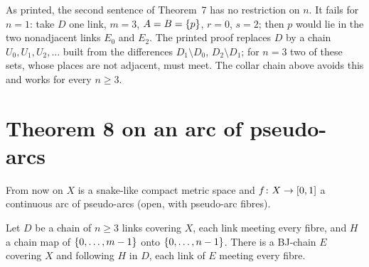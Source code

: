 \begin{remark}\label{rem:bj7-false}
As printed, the second sentence of Theorem~7 has no restriction on $n$. It fails for $n=1$: take $D$ one link, $m=3$, $A=B=\left\{ p \right\}$, $r=0$, $s=2$; then $p$ would lie
in the two nonadjacent links $E_0$ and $E_2$. The printed proof replaces $D$ by a chain $U_0,U_1,U_2,\dots$ built from the differences $D_1\setminus D_0$, $D_2\setminus
D_1$; for $n=3$ two of these sets, whose places are not adjacent, must meet. The collar chain above avoids this and works for every $n\ge3$.
\end{remark}


\section{Theorem 8 on an arc of pseudo-arcs}

From now on $X$ is a snake-like compact metric space and $f\colon X\to[0,1]$ a continuous arc of pseudo-arcs (open, with pseudo-arc fibres).

\begin{theorem}\label{thm:bj8}
Let $D$ be a chain of $n\ge3$ links covering $X$, each link meeting every fibre, and $H$ a chain map of $\left\{ 0,\dots,m-1 \right\}$ onto $\left\{ 0,\dots,n-1 \right\}$. There is a BJ-chain
$E$ covering $X$ and following $H$ in $D$, each link of $E$ meeting every fibre.
\end{theorem}

